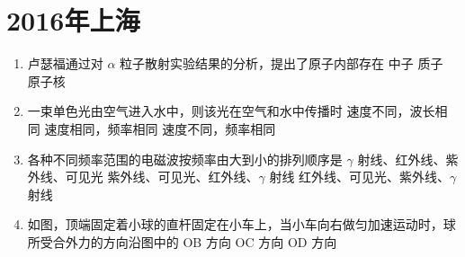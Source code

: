 \documentclass[\gkver]{gaokaozhenti}
\begin{document}
\chapter{2016年上海}

\begin{enumerate}
\item
卢瑟福通过对 $\alpha$ 粒子散射实验结果的分析，提出了原子内部存在
{中子}
{质子}
{原子核}

\item
一束单色光由空气进入水中，则该光在空气和水中传播时
{速度不同，波长相同}
{速度相同，频率相同}
{速度不同，频率相同}

\item
各种不同频率范围的电磁波按频率由大到小的排列顺序是
{$\gamma$ 射线、红外线、紫外线、可见光}
{紫外线、可见光、红外线、$\gamma$ 射线}
{红外线、可见光、紫外线、$\gamma$ 射线}

\item
如图，顶端固定着小球的直杆固定在小车上，当小车向右做匀加速运动时，球所受合外力的方向沿图中的
\onepicture[w=2.86cm]{}
{OB 方向}
{OC 方向}
{OD 方向}


\end{enumerate}
\end{document}
